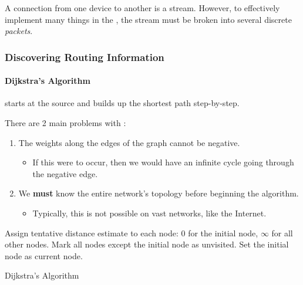 \begin{definition}[Packet]\label{def:Packet}
  A connection from one device to another is a stream.
  However, to effectively implement many things in the , the stream must be broken into several discrete \emph{packets}.
\end{definition}

\subsubsection{Discovering Routing Information}\label{subsubsec:Discovering_Route_Info}
\paragraph{Dijkstra's Algorithm}\label{par:Dijkstras_Algorithm}
 starts at the source and builds up the shortest path step-by-step.

There are 2 main problems with :
\begin{enumerate}[noitemsep]
\item The weights along the edges of the graph cannot be negative.
  \begin{itemize}[noitemsep]
  \item If this were to occur, then we would have an infinite cycle going through the negative edge.
  \end{itemize}
\item We \textbf{must} know the entire network's topology before beginning the algorithm.
  \begin{itemize}[noitemsep]
  \item Typically, this is not possible on vast networks, like the Internet.
  \end{itemize}
\end{enumerate}

\begin{algorithm}[H]
  \DontPrintSemicolon{}
  \BlankLine{}

   Assign tentative distance estimate to each node: 0 for the initial node, $\infty$ for all other nodes. \;
   Mark all nodes except the initial node as unvisited. \;
   Set the initial node as current node. \;
  \caption{Dijkstra's Algorithm}
  \label{algo:Dijkstras_Algorithm}
\end{algorithm}

